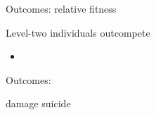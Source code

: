 \begin{frame}{Outcomes: relative fitness}

Level-two individuals outcompete

\begin{itemize}

\item

\end{itemize}

\end{frame}


\begin{frame}{Outcomes: }

damage suicide

\end{frame}
